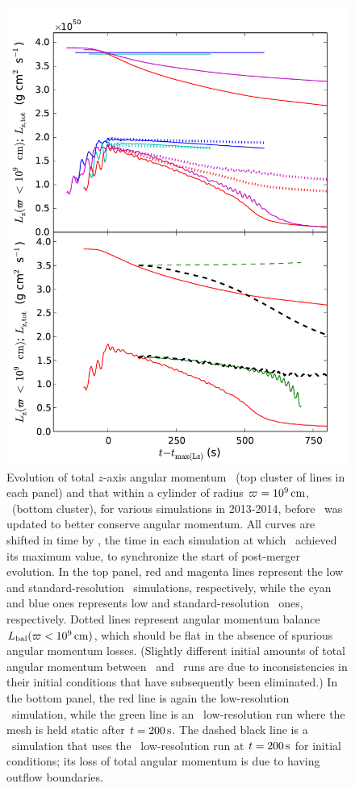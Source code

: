 \begin{figure}
\centering
\includegraphics[angle=0,width=0.6\columnwidth]{chapter3_zhu+u/figures/lz_development.pdf}
\caption{Evolution of total $z$-axis angular momentum \Lztot\ (top cluster of lines in each panel) and that within a cylinder of radius $\varpi = 10^9\,\mathrm{cm}$, \Lzinner\ (bottom cluster), for various simulations in 2013-2014, before \arepo\ was updated to better conserve angular momentum.  All curves are shifted in time by \tlm, the time in each simulation at which \Lzinner\ achieved its maximum value, to synchronize the start of post-merger evolution.  In the top panel, red and magenta lines represent the low and standard-resolution \arepo\ simulations, respectively, while the cyan and blue ones represents low and standard-resolution \gasoline\ ones, respectively.  Dotted lines represent angular momentum balance $\Lbal(\winnercyl)$, which should be flat in the absence of spurious angular momentum losses.  (Slightly different initial amounts of total angular momentum between \arepo\ and \gasoline\ runs are due to inconsistencies in their initial conditions that have subsequently been eliminated.)  In the bottom panel, the red line is again the low-resolution \arepo\ simulation, while the green line is an \arepo\ low-resolution run where the mesh is held static after $t = 200\,\mathrm{s}$.  The dashed black line is a \flash\ simulation that uses the \arepo\ low-resolution run at $t = 200\,\mathrm{s}$ for initial conditions; its loss of total angular momentum is due to having outflow boundaries.}
\label{fig:c3_fix_angmo}
\end{figure}


